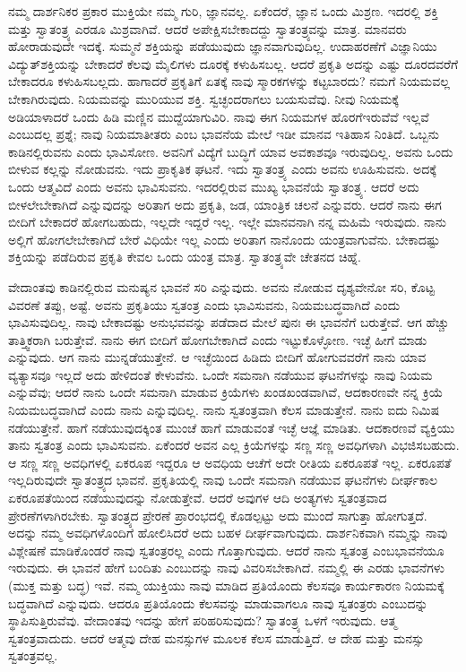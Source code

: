 \vskip 6pt

ನಮ್ಮ ದಾರ್ಶನಿಕರ ಪ್ರಕಾರ ಮುಕ್ತಿಯೇ ನಮ್ಮ ಗುರಿ, ಜ್ಞಾನವಲ್ಲ. ಏಕೆಂದರೆ, ಜ್ಞಾನ ಒಂದು ಮಿಶ್ರಣ. ಇದರಲ್ಲಿ ಶಕ್ತಿ ಮತ್ತು ಸ್ವಾತಂತ್ರ್ಯ ಎರಡೂ ಮಿಶ್ರವಾಗಿವೆ. ಆದರೆ ಅಪೇಕ್ಷಿಸಬೇಕಾದದ್ದು ಸ್ವಾತಂತ್ರ್ಯವನ್ನು ಮಾತ್ರ. ಮಾನವರು ಹೋರಾಡುವುದೇ ಇದಕ್ಕೆ. ಸುಮ್ಮನೆ ಶಕ್ತಿಯನ್ನು ಪಡೆಯುವುದು ಜ್ಞಾನವಾಗುವುದಿಲ್ಲ. ಉದಾಹರಣೆಗೆ ವಿಜ್ಞಾನಿಯು ವಿದ್ಯುತ್​ಶಕ್ತಿಯನ್ನು ಬೇಕಾದರೆ ಕೆಲವು ಮೈಲಿಗಳು ದೂರಕ್ಕೆ ಕಳುಹಿಸಬಲ್ಲ. ಆದರೆ ಪ್ರಕೃತಿ ಅದನ್ನು ಎಷ್ಟು ದೂರದವರೆಗೆ ಬೇಕಾದರೂ ಕಳುಹಿಸಬಲ್ಲದು. ಹಾಗಾದರೆ ಪ್ರಕೃತಿಗೆ ಏತಕ್ಕೆ ನಾವು ಸ್ಮಾರಕಗಳನ್ನು ಕಟ್ಟಬಾರದು? ನಮಗೆ ನಿಯಮವಲ್ಲ ಬೇಕಾಗಿರುವುದು. ನಿಯಮವನ್ನು ಮುರಿಯುವ ಶಕ್ತಿ. ಸ್ವಚ್ಛಂದರಾಗಲು ಬಯಸುವೆವು. ನೀವು ನಿಯಮಕ್ಕೆ ಅಡಿಯಾಳಾದರೆ ಒಂದು ಹಿಡಿ ಮಣ್ಣಿನ ಮುದ್ದೆಯಾಗುವಿರಿ. ನಾವು ಈಗ ನಿಯಮಗಳ ಹೊರಗೆ\break ಇರುವೆವೆ ಇಲ್ಲವೆ ಎಂಬುದಲ್ಲ ಪ್ರಶ್ನೆ; ನಾವು ನಿಯಮಾತೀತರು ಎಂಬ ಭಾವನೆಯ ಮೇಲೆ ಇಡೀ ಮಾನವ ಇತಿಹಾಸ ನಿಂತಿದೆ. ಒಬ್ಬನು ಕಾಡಿನಲ್ಲಿರುವನು ಎಂದು ಭಾವಿಸೋಣ. ಅವನಿಗೆ ವಿದ್ಯೆಗೆ ಬುದ್ಧಿಗೆ ಯಾವ ಅವಕಾಶವೂ ಇರುವುದಿಲ್ಲ. ಅವನು ಒಂದು ಬೀಳುವ ಕಲ್ಲನ್ನು ನೋಡುವನು. ಇದು ಪ್ರಾಕೃತಿಕ ಘಟನೆ. ಇದು ಸ್ವಾತಂತ್ರ್ಯ ಎಂದು ಅವನು ಊಹಿಸುವನು. ಅದಕ್ಕೆ ಒಂದು ಆತ್ಮವಿದೆ ಎಂದು ಅವನು ಭಾವಿಸುವನು. ಇದರಲ್ಲಿರುವ ಮುಖ್ಯ ಭಾವನೆಯೆ ಸ್ವಾತಂತ್ರ್ಯ. ಆದರೆ ಅದು ಬೀಳಲೇಬೇಕಾಗಿದೆ ಎನ್ನುವುದನ್ನು ಅರಿತಾಗ ಅದು ಪ್ರಕೃತಿ, ಜಡ, ಯಾಂತ್ರಿಕ ಚಲನೆ ಎನ್ನುವರು. ಆದರೆ ನಾನು ಈಗ ಬೀದಿಗೆ ಬೇಕಾದರೆ ಹೋಗಬಹುದು, ಇಲ್ಲದೇ ಇದ್ದರೆ ಇಲ್ಲ. ಇಲ್ಲೇ ಮಾನವನಾಗಿ ನನ್ನ ಮಹಿಮೆ ಇರುವುದು. ನಾನು ಅಲ್ಲಿಗೆ ಹೋಗಲೇಬೇಕಾಗಿದೆ ಬೇರೆ ವಿಧಿಯೇ ಇಲ್ಲ ಎಂದು ಅರಿತಾಗ ನಾನೊಂದು ಯಂತ್ರವಾಗುವೆನು. ಬೇಕಾದಷ್ಟು ಶಕ್ತಿಯನ್ನು ಪಡೆದಿರುವ ಪ್ರಕೃತಿ ಕೇವಲ ಒಂದು ಯಂತ್ರ ಮಾತ್ರ. ಸ್ವಾತಂತ್ರ್ಯವೇ ಚೇತನದ ಚಿಹ್ನೆ.

\vskip 6pt

ವೇದಾಂತವು ಕಾಡಿನಲ್ಲಿರುವ ಮನುಷ್ಯನ ಭಾವನೆ ಸರಿ ಎನ್ನುವುದು. ಅವನು ನೋಡುವ ದೃಶ್ಯವೇನೋ ಸರಿ, ಕೊಟ್ಟ ವಿವರಣೆ ತಪ್ಪು, ಅಷ್ಟೆ. ಅವನು ಪ್ರಕೃತಿಯು ಸ್ವತಂತ್ರ ಎಂದು ಭಾವಿಸುವನು, ನಿಯಮಬದ್ಧವಾಗಿದೆ ಎಂದು ಭಾವಿಸುವುದಿಲ್ಲ. ನಾವು ಬೇಕಾದಷ್ಟು ಅನುಭವವನ್ನು ಪಡೆದಾದ ಮೇಲೆ ಪುನಃ ಈ ಭಾವನೆಗೆ ಬರುತ್ತೇವೆ. ಆಗ ಹೆಚ್ಚು ತಾತ್ತ್ವಿಕರಾಗಿ ಬರುತ್ತೇವೆ. ನಾನು ಈಗ ಬೀದಿಗೆ ಹೋಗಬೇಕಾಗಿದೆ ಎಂದು ಇಟ್ಟುಕೊಳ್ಳೋಣ. ಇಚ್ಛೆ ಹೀಗೆ ಮಾಡು ಎನ್ನುವುದು. ಆಗ ನಾನು ಮುನ್ನಡೆಯುತ್ತೇನೆ. ಆ ಇಚ್ಛೆಯಿಂದ ಹಿಡಿದು ಬೀದಿಗೆ ಹೋಗುವವರೆಗೆ ನಾನು ಯಾವ ವ್ಯತ್ಯಾಸವೂ ಇಲ್ಲದೆ ಅದು ಹೇಳಿದಂತೆ ಕೇಳುವೆನು. ಒಂದೇ ಸಮನಾಗಿ ನಡೆಯುವ ಘಟನೆಗಳನ್ನು ನಾವು ನಿಯಮ ಎನ್ನುವೆವು; ಆದರೆ ನಾನು ಒಂದೇ ಸಮನಾಗಿ ಮಾಡುವ ಕ್ರಿಯೆಗಳು ಖಂಡಖಂಡವಾಗಿವೆ, ಆದಕಾರಣವೇ ನನ್ನ ಕ್ರಿಯೆ ನಿಯಮಬದ್ಧವಾಗಿದೆ ಎಂದು ನಾನು ಎನ್ನುವುದಿಲ್ಲ. ನಾನು ಸ್ವತಂತ್ರವಾಗಿ ಕೆಲಸ ಮಾಡುತ್ತೇನೆ. ನಾನು ಐದು ನಿಮಿಷ ನಡೆಯುತ್ತೇನೆ. ಹಾಗೆ ನಡೆಯುವುದಕ್ಕಿಂತ ಮುಂಚೆ ಹಾಗೆ ಮಾಡುವಂತೆ ಇಚ್ಛೆ ಆಜ್ಞೆ ಮಾಡಿತು. ಆದಕಾರಣವೆ ವ್ಯಕ್ತಿಯು ತಾನು ಸ್ವತಂತ್ರ ಎಂದು ಭಾವಿಸುವನು. ಏಕೆಂದರೆ ಅವನ ಎಲ್ಲ ಕ್ರಿಯೆಗಳನ್ನು ಸಣ್ಣ ಸಣ್ಣ ಅವಧಿಗಳಾಗಿ ವಿಭಜಿಸಬಹುದು. ಆ ಸಣ್ಣ ಸಣ್ಣ ಅವಧಿಗಳಲ್ಲಿ ಏಕರೂಪ ಇದ್ದರೂ ಆ ಅವಧಿಯ ಆಚೆಗೆ ಅದೇ ರೀತಿಯ ಏಕರೂಪತೆ ಇಲ್ಲ. ಏಕರೂಪತೆ ಇಲ್ಲದಿರುವುದೇ ಸ್ವಾತಂತ್ರ್ಯದ ಭಾವನೆ. ಪ್ರಕೃತಿಯಲ್ಲಿ ನಾವು ಒಂದೇ ಸಮನಾಗಿ ನಡೆಯುವ ಘಟನೆಗಳು ದೀರ್ಘಕಾಲ ಏಕರೂಪತೆಯಿಂದ ನಡೆಯುವುದನ್ನು ನೋಡುತ್ತೇವೆ. ಆದರೆ ಅವುಗಳ ಆದಿ ಅಂತ್ಯಗಳು ಸ್ವತಂತ್ರವಾದ ಪ್ರೇರಣೆಗಳಾಗಿರಬೇಕು. ಸ್ವಾತಂತ್ರ್ಯದ ಪ್ರೇರಣೆ ಪ್ರಾರಂಭದಲ್ಲಿ ಕೊಡಲ್ಪಟ್ಟು ಅದು ಮುಂದೆ ಸಾಗುತ್ತಾ ಹೋಗುತ್ತದೆ. ಅದನ್ನು ನಮ್ಮ ಅವಧಿಗಳೊಂದಿಗೆ ಹೋಲಿಸಿದರೆ ಅದು ಬಹಳ ದೀರ್ಘವಾಗುವುದು. ದಾರ್ಶನಿಕವಾಗಿ ನಮ್ಮನ್ನು ನಾವು ವಿಶ್ಲೇಷಣೆ ಮಾಡಿಕೊಂಡರೆ ನಾವು ಸ್ವತಂತ್ರರಲ್ಲ ಎಂದು ಗೊತ್ತಾಗುವುದು. ಆದರೆ ನಾನು ಸ್ವತಂತ್ರ ಎಂಬ\break ಭಾವನೆಯೂ ಇರುವುದು. ಈ ಭಾವನೆ ಹೇಗೆ ಬಂದಿತು ಎಂಬುದನ್ನು ನಾವು ವಿವರಿಸಬೇಕಾಗಿದೆ. ನಮ್ಮಲ್ಲಿ ಈ ಎರಡು ಭಾವನೆಗಳು (ಮುಕ್ತ ಮತ್ತು ಬದ್ಧ) ಇವೆ. ನಮ್ಮ ಯುಕ್ತಿಯು ನಾವು ಮಾಡಿದ ಪ್ರತಿಯೊಂದು ಕೆಲಸವೂ ಕಾರ್ಯಕಾರಣ ನಿಯಮಕ್ಕೆ ಬದ್ಧವಾಗಿದೆ ಎನ್ನುವುದು. ಆದರೂ ಪ್ರತಿಯೊಂದು ಕೆಲಸವನ್ನು ಮಾಡುವಾಗಲೂ ನಾವು ಸ್ವತಂತ್ರರು ಎಂಬುದನ್ನು ಸ್ಥಾಪಿಸುತ್ತಿರುವೆವು. ವೇದಾಂತವು ಇದನ್ನು ಹೇಗೆ ಪರಿಹರಿಸುವುದು? ಸ್ವಾತಂತ್ರ್ಯ ಒಳಗೆ ಇರುವುದು. ಆತ್ಮ ಸ್ವತಂತ್ರವಾದುದು. ಆದರೆ ಆತ್ಮವು ದೇಹ ಮನಸ್ಸುಗಳ ಮೂಲಕ ಕೆಲಸ ಮಾಡುತ್ತಿದೆ. ಆ ದೇಹ ಮತ್ತು ಮನಸ್ಸು ಸ್ವತಂತ್ರವಲ್ಲ.

